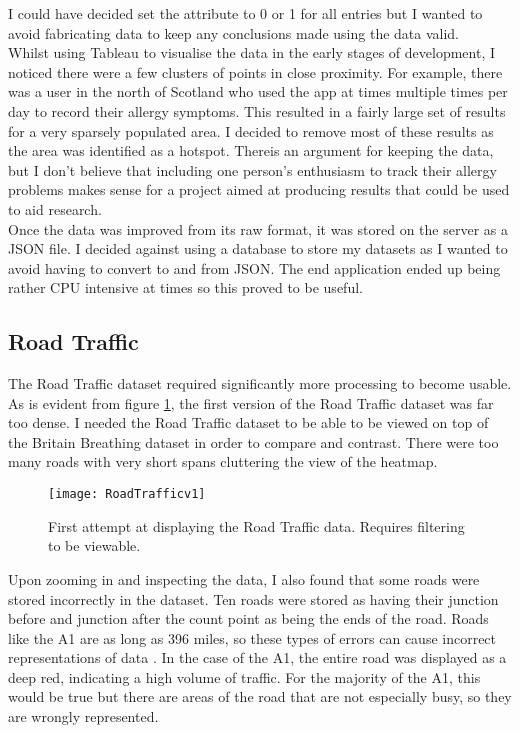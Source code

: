 I could have decided set the attribute to 0 or 1 for all entries but I wanted to avoid fabricating data to keep any conclusions made using the data valid.\\

Whilst using Tableau to visualise the data in the early stages of development, I noticed there were a few clusters of points in close proximity. For example, there was a user in the north of Scotland who used the app at times multiple times per day to record their allergy symptoms. This resulted in a fairly large set of results for a very sparsely populated area. I decided to remove most of these results as the area was identified as a hotspot. Thereis an argument for keeping the data, but I don't believe that including one person's enthusiasm to track their allergy problems makes sense for a project aimed at producing results that could be used to aid research.\\

Once the data was improved from its raw format, it was stored on the server as a JSON file. I decided against using a database to store my datasets as I wanted to avoid having to convert to and from JSON. The end application ended up being rather CPU intensive at times so this proved to be useful.

\subsection{Road Traffic}

The Road Traffic dataset required significantly more processing to become usable. As is evident from figure \ref{fig:rt}, the first version of the Road Traffic dataset was far too dense. I needed the Road Traffic dataset to be able to be viewed on top of the Britain Breathing dataset in order to compare and contrast. There were too many roads with very short spans cluttering the view of the heatmap.\\

\begin{figure}[H]
\begin{center}
\texttt{[image: RoadTrafficv1]}
\caption{First attempt at displaying the Road Traffic data. Requires filtering to be viewable.}
\label{fig:rt}
\end{center}
\end{figure}

Upon zooming in and inspecting the data, I also found that some roads were stored incorrectly in the dataset. Ten roads were stored as having their junction before and junction after the count point as being the ends of the road. Roads like the A1 are as long as 396 miles, so these types of errors can cause incorrect representations of data \cite{longestRoad}. In the case of the A1, the entire road was displayed as a deep red, indicating a high volume of traffic. For the majority of the A1, this would be true but there are areas of the road that are not especially busy, so they are  wrongly represented.\\

